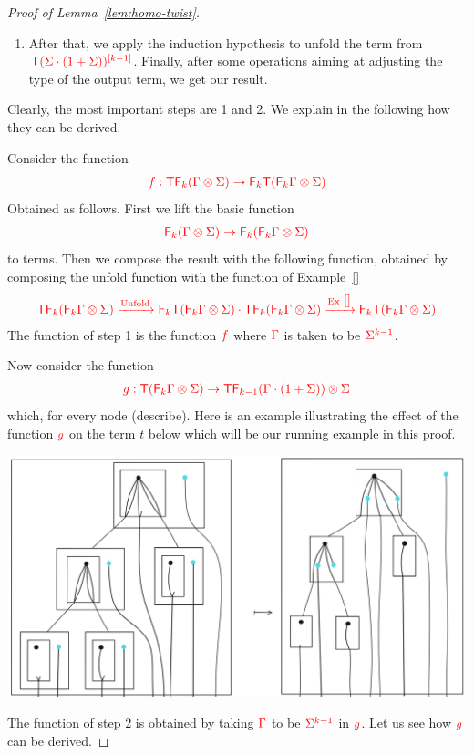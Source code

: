 \begin{proof}[Proof of Lemma~\ref{lem:homo-twist}]
\begin{enumerate}
\begin{center}
\end{center}
\item After that, we apply the induction hypothesis to unfold the term from $\ranked{\tmonad\mati {k-1} {(\Sigma\cdot(1+\Sigma))}}$. Finally, after some operations aiming at adjusting the type of the output term, we get our result.
\end{enumerate}
Clearly, the most important steps are 1 and 2. We explain in the following how they can be derived. 

Consider the function 
\begin{align*}
\ranked{f:\tmonad \reduce k (\Gamma\otimes \Sigma)\to \reduce k \tmonad(\reduce k \Gamma\otimes \Sigma)}
\end{align*}
Obtained as follows. First we lift the basic function
\begin{align*}
\ranked { \reduce k (\Gamma\otimes \Sigma) \to  \reduce k (\reduce k \Gamma\otimes \Sigma)}
\end{align*}
to terms. Then we compose the result with the following function, obtained by composing the unfold function with the function of Example~\ref{}
\begin{align*}
 \ranked{\tmonad \reduce k (\reduce k \Gamma\otimes \Sigma) \xrightarrow{\text{Unfold}}
 \reduce k \tmonad (\reduce k \Gamma\otimes \Sigma)\cdot \tmonad \reduce k (\reduce k \Gamma\otimes \Sigma) \xrightarrow{\text{Ex}~\ref{}} \reduce k \tmonad (\reduce k \Gamma\otimes \Sigma)}
\end{align*}
The function of step 1 is the function $\ranked{f}$ where $\ranked{\Gamma}$ is taken to be $\ranked{\Sigma^{k-1}}$.



Now consider the function
\begin{align*}
\ranked{g:\tmonad (\reduce k \Gamma \otimes \Sigma) \to \tmonad \reduce {k-1} (\Gamma\cdot(1+\Sigma))\otimes \Sigma}
\end{align*}
which, for every node (describe). Here is an example illustrating the effect of the function $\ranked{g}$ on the term $t$ below which will be our running example in this proof.
\begin{center}
\includegraphics[scale=.12]{MyPic22.jpg}
\end{center}
The function of step 2 is obtained by taking $\ranked{\Gamma}$ to be $\ranked{\Sigma^{k-1}}$ in $\ranked{g}$. Let us see how $\ranked{g}$ can be derived.


\end{proof}

